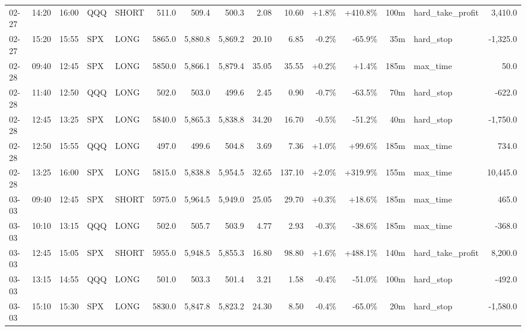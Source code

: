 \documentclass[11pt,a4paper,twoside]{article}
\begin{document}
\begin{landscape}
\begin{center}
\begin{longtable}{>{\color{txtmain}}l l l l l r r r r r r r r >{\color{txtmain}}l r}
02-27 & 14:20 & 16:00 & QQQ & SHORT & 511.0 & 509.4 & 500.3 & 2.08 & 10.60 & \textcolor{wingreen}{+1.8\%} & \textcolor{wingreen}{+410.8\%} & 100m & hard\_take\_profit & \textcolor{wingreen}{3,410.0} \\
02-27 & 15:20 & 15:55 & SPX & LONG & 5865.0 & 5,880.8 & 5,869.2 & 20.10 & 6.85 & \textcolor{lossred}{-0.2\%} & \textcolor{lossred}{-65.9\%} & 35m & hard\_stop & \textcolor{lossred}{-1,325.0} \\
02-28 & 09:40 & 12:45 & SPX & LONG & 5850.0 & 5,866.1 & 5,879.4 & 35.05 & 35.55 & \textcolor{wingreen}{+0.2\%} & \textcolor{wingreen}{+1.4\%} & 185m & max\_time & \textcolor{wingreen}{50.0} \\
02-28 & 11:40 & 12:50 & QQQ & LONG & 502.0 & 503.0 & 499.6 & 2.45 & 0.90 & \textcolor{lossred}{-0.7\%} & \textcolor{lossred}{-63.5\%} & 70m & hard\_stop & \textcolor{lossred}{-622.0} \\
02-28 & 12:45 & 13:25 & SPX & LONG & 5840.0 & 5,865.3 & 5,838.8 & 34.20 & 16.70 & \textcolor{lossred}{-0.5\%} & \textcolor{lossred}{-51.2\%} & 40m & hard\_stop & \textcolor{lossred}{-1,750.0} \\
02-28 & 12:50 & 15:55 & QQQ & LONG & 497.0 & 499.6 & 504.8 & 3.69 & 7.36 & \textcolor{wingreen}{+1.0\%} & \textcolor{wingreen}{+99.6\%} & 185m & max\_time & \textcolor{wingreen}{734.0} \\
02-28 & 13:25 & 16:00 & SPX & LONG & 5815.0 & 5,838.8 & 5,954.5 & 32.65 & 137.10 & \textcolor{wingreen}{+2.0\%} & \textcolor{wingreen}{+319.9\%} & 155m & max\_time & \textcolor{wingreen}{10,445.0} \\
03-03 & 09:40 & 12:45 & SPX & SHORT & 5975.0 & 5,964.5 & 5,949.0 & 25.05 & 29.70 & \textcolor{wingreen}{+0.3\%} & \textcolor{wingreen}{+18.6\%} & 185m & max\_time & \textcolor{wingreen}{465.0} \\
03-03 & 10:10 & 13:15 & QQQ & LONG & 502.0 & 505.7 & 503.9 & 4.77 & 2.93 & \textcolor{lossred}{-0.3\%} & \textcolor{lossred}{-38.6\%} & 185m & max\_time & \textcolor{lossred}{-368.0} \\
03-03 & 12:45 & 15:05 & SPX & SHORT & 5955.0 & 5,948.5 & 5,855.3 & 16.80 & 98.80 & \textcolor{wingreen}{+1.6\%} & \textcolor{wingreen}{+488.1\%} & 140m & hard\_take\_profit & \textcolor{wingreen}{8,200.0} \\
03-03 & 13:15 & 14:55 & QQQ & LONG & 501.0 & 503.3 & 501.4 & 3.21 & 1.58 & \textcolor{lossred}{-0.4\%} & \textcolor{lossred}{-51.0\%} & 100m & hard\_stop & \textcolor{lossred}{-492.0} \\
03-03 & 15:10 & 15:30 & SPX & LONG & 5830.0 & 5,847.8 & 5,823.2 & 24.30 & 8.50 & \textcolor{lossred}{-0.4\%} & \textcolor{lossred}{-65.0\%} & 20m & hard\_stop & \textcolor{lossred}{-1,580.0} \\

\end{longtable}
\end{center}
\end{landscape}
\end{document}
